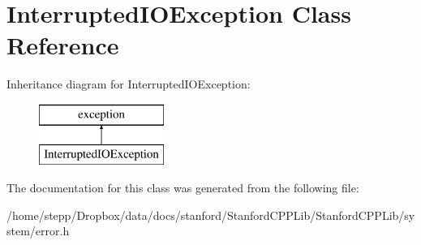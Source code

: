 \hypertarget{classInterruptedIOException}{}\section{Interrupted\+I\+O\+Exception Class Reference}
\label{classInterruptedIOException}
Inheritance diagram for Interrupted\+I\+O\+Exception\+:\begin{figure}[H]
\begin{center}
\leavevmode
\includegraphics[height=2.000000cm]{classInterruptedIOException}
\end{center}
\end{figure}


The documentation for this class was generated from the following file\+:\begin{DoxyCompactItemize}
\item 
/home/stepp/\+Dropbox/data/docs/stanford/\+Stanford\+C\+P\+P\+Lib/\+Stanford\+C\+P\+P\+Lib/system/error.\+h\end{DoxyCompactItemize}
